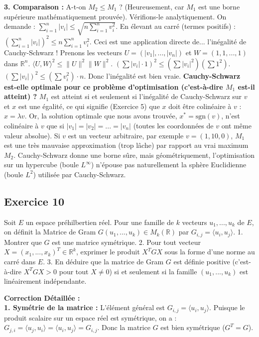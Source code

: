 \documentclass[11pt,a4paper]{report}
\begin{document}
\textbf{3. Comparaison :}
A-t-on $M_2 \le M_1$ ? (Heureusement, car $M_1$ est une borne supérieure mathématiquement prouvée).
Vérifions-le analytiquement.
On demande : $\sum_{i=1}^n |v_i| \le \sqrt{n \sum_{i=1}^n v_i^2}$.
En élevant au carré (termes positifs) :
$(\sum_{i=1}^n |v_i|)^2 \le n \sum_{i=1}^n v_i^2$.
Ceci est une application directe de... l'inégalité de Cauchy-Schwarz !
Prenons les vecteurs $U = (|v_1|, ..., |v_n|)$ et $W = (1, 1, ..., 1)$ dans $\mathbb{R}^n$.
$\langle U, W \rangle^2 \le \|U\|^2 \|W\|^2$.
$(\sum |v_i| \cdot 1)^2 \le (\sum |v_i|^2) (\sum 1^2)$.
$(\sum |v_i|)^2 \le (\sum v_i^2) \cdot n$.
Donc l'inégalité est bien vraie.
\textbf{Cauchy-Schwarz est-elle optimale pour ce problème d'optimisation (c'est-à-dire $M_1$ est-il atteint) ?}
$M_1$ est atteint si et seulement si l'inégalité de Cauchy-Schwarz sur $v$ et $x$ est une égalité, ce qui signifie (Exercice 5) que $x$ doit être colinéaire à $v$ : $x = \lambda v$.
Or, la solution optimale que nous avons trouvée, $x^* = \text{sgn}(v)$, n'est colinéaire à $v$ que si $|v_1| = |v_2| = ... = |v_n|$ (toutes les coordonnées de $v$ ont même valeur absolue).
Si $v$ est un vecteur arbitraire, par exemple $v = (1, 10, 0)$, $M_1$ est une très mauvaise approximation (trop lâche) par rapport au vrai maximum $M_2$. Cauchy-Schwarz donne une borne sûre, mais géométriquement, l'optimisation sur un hypercube (boule $L^\infty$) n'épouse pas naturellement la sphère Euclidienne (boule $L^2$) utilisée par Cauchy-Schwarz.

\subsection*{Exercice 10}

Soit $E$ un espace préhilbertien réel. Pour une famille de $k$ vecteurs $u_1, ..., u_k$ de $E$, on définit la Matrice de Gram $G(u_1, ..., u_k) \in M_k(\mathbb{R})$ par $G_{i,j} = \langle u_i, u_j \rangle$.
1. Montrer que $G$ est une matrice symétrique.
2. Pour tout vecteur $X = (x_1, ..., x_k)^T \in \mathbb{R}^k$, exprimer le produit $X^T G X$ sous la forme d'une norme au carré dans $E$.
3. En déduire que la matrice de Gram $G$ est définie positive (c'est-à-dire $X^T G X > 0$ pour tout $X \neq 0$) si et seulement si la famille $(u_1, ..., u_k)$ est linéairement indépendante.

\textbf{Correction Détaillée :}\\ \textbf{1. Symétrie de la matrice :}
L'élément général est $G_{i,j} = \langle u_i, u_j \rangle$.
Puisque le produit scalaire sur un espace réel est symétrique, on a :
$G_{j,i} = \langle u_j, u_i \rangle = \langle u_i, u_j \rangle = G_{i,j}$.
Donc la matrice $G$ est bien symétrique ($G^T = G$).
\end{document}

